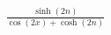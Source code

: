 \documentclass[preview]{standalone}
\begin{document}
\begin{align*}
\frac{\sinh(2n)}{\cos(2x)+\cosh(2n)}
\end{align*}
\end{document}
